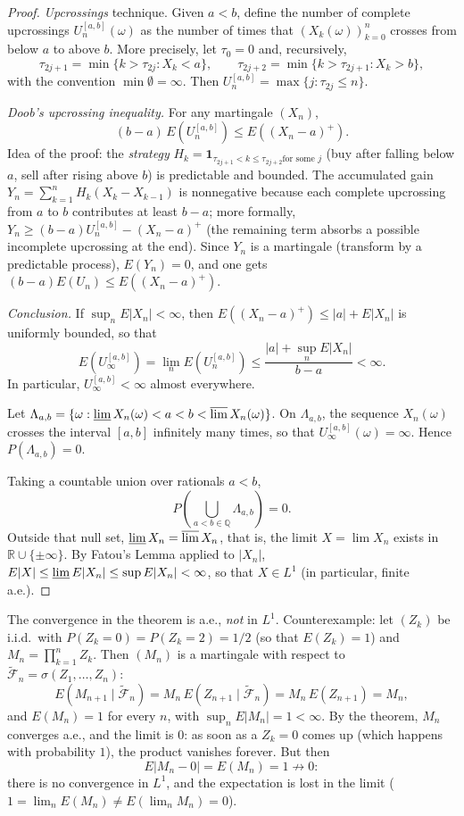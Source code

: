 \documentclass[11pt, a4paper]{article}
\begin{document}
\begin{proof}
\emph{Upcrossings} technique. Given $a < b$, define the number of complete upcrossings
$U_n^{[a,b]}(\omega)$ as the number of times that $(X_k(\omega))_{k=0}^n$ crosses from below
$a$ to above $b$. More precisely, let $\tau_0 = 0$ and, recursively,
$$ \tau_{2j+1} = \min\{k > \tau_{2j} : X_k < a\}, \qquad \tau_{2j+2} = \min\{k > \tau_{2j+1} : X_k
> b\}, $$
with the convention $\min \emptyset = \infty$. Then $U_n^{[a,b]} = \max\{j : \tau_{2j} \le n\}$.

\textit{Doob's upcrossing inequality.} For any martingale $(X_n)$,
$$ (b - a) \, E(U_n^{[a,b]}) \le E((X_n - a)^+). $$
Idea of the proof: the \emph{strategy} $H_k = \mathbf{1}_{\tau_{2j+1} < k \le \tau_{2j+2} \text{
for some } j}$ (buy after falling below $a$, sell after rising above $b$) is
predictable and bounded. The accumulated gain $Y_n = \sum_{k=1}^n H_k(X_k - X_{k-1})$ is
nonnegative because each complete upcrossing from $a$ to $b$ contributes at least $b - a$; more
formally, $Y_n \ge (b - a) U_n^{[a,b]} - (X_n - a)^+$ (the remaining term absorbs a
possible incomplete upcrossing at the end). Since $Y_n$ is a martingale (transform by a predictable process),
$E(Y_n) = 0$, and one gets $(b - a) E(U_n) \le E((X_n - a)^+)$.

\textit{Conclusion.} If $\sup_n E|X_n| < \infty$, then $E((X_n - a)^+) \le |a| + E|X_n|$
is
uniformly bounded, so that
$$ E(U_\infty^{[a,b]}) = \lim_n E(U_n^{[a,b]}) \le \frac{|a| + \sup_n E|X_n|}{b - a} < \infty. $$
In particular, $U_\infty^{[a,b]} < \infty$ almost everywhere.

Let $\Lambda_{a,b} = \{\omega : \varliminf X_n(\omega) < a < b < \varlimsup X_n(\omega)\}$.
On $\Lambda_{a,b}$, the sequence $X_n(\omega)$ crosses the interval $[a, b]$ infinitely many times, so
that $U_\infty^{[a,b]}(\omega) = \infty$. Hence $P(\Lambda_{a,b}) = 0$.

Taking a countable union over rationals $a < b$,
$$ P\!\left(\bigcup_{a < b \in \mathbb{Q}} \Lambda_{a,b}\right) = 0. $$
Outside that null set, $\varliminf X_n = \varlimsup X_n$, that is, the limit
$X = \lim X_n$ exists in $\mathbb{R} \cup \{\pm\infty\}$. By Fatou's Lemma applied to $|X_n|$,
$E|X| \le \varliminf E|X_n| \le \sup E|X_n| < \infty$, so that $X \in L^1$ (in particular,
finite a.e.).
\end{proof}

\obs The convergence in the theorem is a.e., \emph{not} in $L^1$. Counterexample: let $(Z_k)$ be
i.i.d.\ with $P(Z_k = 0) = P(Z_k = 2) = 1/2$ (so that $E(Z_k) = 1$) and $M_n = \prod_{k=1}^n Z_k$.
Then $(M_n)$ is a martingale with respect to $\widetilde{\mathcal{F}}_n = \sigma(Z_1, \dots,
Z_n)$:
$$ E(M_{n+1} \mid \widetilde{\mathcal{F}}_n) = M_n \, E(Z_{n+1} \mid
\widetilde{\mathcal{F}}_n) = M_n \, E(Z_{n+1}) = M_n, $$
and $E(M_n) = 1$ for every $n$, with $\sup_n E|M_n| = 1 < \infty$. By the theorem, $M_n$ converges
a.e., and the limit is $0$: as soon as a $Z_k = 0$ comes up (which happens with probability $1$),
the product vanishes forever. But then
$$ E|M_n - 0| = E(M_n) = 1 \not\to 0: $$
there is no convergence in $L^1$, and the expectation is lost in the limit
($1 = \lim_n E(M_n) \ne E(\lim_n M_n) = 0$).
\end{document}
